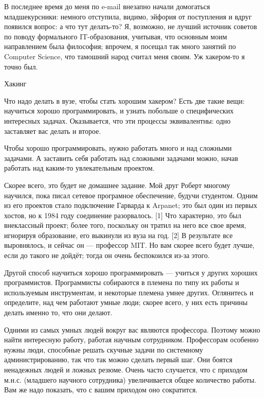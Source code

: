 \documentclass[ebook,12pt,oneside,openany]{memoir}
\begin{document}
\maketitle

В последнее время до меня по e-mail внезапно начали домогаться
младшекурсники: немного отступила, видимо, эйфория от поступления и
вдруг появился вопрос: а что тут делать-то? Я, возможно, не лучший
источник советов по поводу формального IT-образования, учитывая, что
основным моим направлением была философия; впрочем, я посещал так
много занятий по Computer Science, что тамошний народ считал меня
своим. Уж хакером-то я точно был.


Хакинг

Что надо делать в вузе, чтобы стать хорошим хакером? Есть две такие
вещи: научиться хорошо программировать, и узнать побольше о
специфических интересных задачах. Оказывается, что эти процессы
эквивалентны: одно заставляет вас делать и второе.

Чтобы хорошо программировать, нужно работать много и над сложными
задачами. А заставить себя работать над сложными задачами можно, начав
работать над каким-то увлекательным проектом.

Скорее всего, это будет не домашнее задание. Мой друг Роберт многому
научился, пока писал сетевое програмное обеспечение, будучи студентом.
Одним из его проектов стало подключение Гарварда к Arpanet; это был
один из первых хостов, но к 1984 году соединение разорвалось. [1] Что
характерно, это был внеклассный проект; более того, поскольку он
тратил на него все свое время, игнорируя образование, его выкинули из
вуза на год. [2] В результате все выровнялось, и сейчас он — профессор
MIT. Но вам скорее всего будет лучше, если до такого не дойдёт; тогда
он очень беспокоился из-за этого.

Другой способ научиться хорошо программировать — учиться у других
хороших программистов. Программисты собираются в племена по типу их
работы и используемым инструментам, и некоторые племена умнее других.
Оглянитесь и определите, над чем работают умные люди; скорее всего, у
них есть причины делать именно то, что они делают.

Одними из самых умных людей вокруг вас являются профессора. Поэтому
можно найти интересную работу, работая научным сотрудником.
Профессорам особенно нужны люди, способные решать скучные задачи по
системному администрированию, так что так можно сделать первый шаг.
Они боятся ненадежных людей и ложных резюме. Очень часто случается,
что с приходом м.н.с. (младшего научного сотрудника) увеличивается
общее количество работы. Вам же надо показать, что с вашим приходом
оно сократится.
\end{document}
